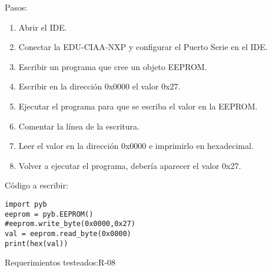 Pasos:
\begin{enumerate}
	\item Abrir el IDE.
	\item Conectar la EDU-CIAA-NXP y configurar el Puerto Serie en el IDE.
	\item Escribir un programa que cree un objeto EEPROM.
	\item Escribir en la dirección 0x0000 el valor 0x27.
	\item Ejecutar el programa para que se escriba el valor en la EEPROM.
	\item Comentar la línea de la escritura.
	\item Leer el valor en la dirección 0x0000 e imprimirlo en hexadecimal.
	\item Volver a ejecutar el programa, debería aparecer el valor 0x27.
\end{enumerate}

Código a escribir:

\begin{verbatim}
import pyb
eeprom = pyb.EEPROM()
#eeprom.write_byte(0x0000,0x27)
val = eeprom.read_byte(0x0000)
print(hex(val))
\end{verbatim}

Requerimientos testeados:R-08


